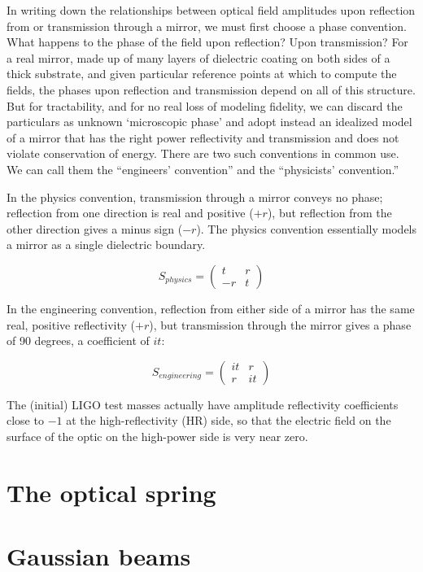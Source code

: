 In writing down the relationships between optical field amplitudes
upon reflection from or transmission through a mirror, we must first
choose a phase convention. What happens to the phase of the field upon
reflection? Upon transmission? For a real mirror, made up of many
layers of dielectric coating on both sides of a thick substrate, and
given particular reference points at which to compute the fields, the
phases upon reflection and transmission depend on all of this
structure. But for tractability, and for no real loss of modeling
fidelity, we can discard the particulars as unknown `microscopic
phase' and adopt instead an idealized model of a mirror that has the
right power reflectivity and transmission and does not violate
conservation of energy. There are two such conventions in common
use. We can call them the ``engineers' convention'' and the
``physicists' convention.''

In the physics convention, transmission through a mirror conveys no
phase; reflection from one direction is real and positive ($+r$),
but reflection from the other direction gives a minus sign ($-r$).
The physics convention essentially models a mirror as a single dielectric
boundary.

\[
S_{physics}=\left(\begin{array}{cc}
t & r\\
-r & t
\end{array}\right)
\]

In the engineering convention, reflection from either side of a mirror
has the same real, positive reflectivity ($+r$), but transmission
through the mirror gives a phase of 90 degrees, a coefficient of $it$:

\[
S_{engineering}=\left(\begin{array}{cc}
it & r\\
r & it
\end{array}\right)
\]

The (initial) LIGO test masses actually have amplitude reflectivity
coefficients close to $-1$ at the high-reflectivity (HR) side, so
that the electric field on the surface of the optic on the high-power
side is very near zero.%

\section{The optical spring}



\section{Gaussian beams}

